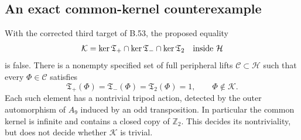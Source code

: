 \subsection*{An exact common-kernel counterexample}

With the corrected third target of B.53, the proposed equality
\[
 \mathcal K=
 \ker\mathfrak T_+\cap\ker\mathfrak T_-\cap\ker\mathfrak T_2
                         \quad\hbox{inside }\mathcal H
\]
is false. There is a nonempty specified set of full peripheral
lifts $\mathscr C\subset\mathcal H$ such that every
$\Phi\in\mathscr C$ satisfies
\[
 \mathfrak T_+(\Phi)=\mathfrak T_-(\Phi)
      =\mathfrak T_2(\Phi)=1,\qquad \Phi\notin\mathcal K.     \tag{B.57.1}
\]
Each such element has a nontrivial tripod action, detected by
the outer automorphism of $A_9$ induced by an odd transposition.
In particular the common kernel is infinite and contains a
closed copy of $\mathbb Z_2$. This decides its nontriviality,
but does not decide whether $\mathcal K$ is trivial.

